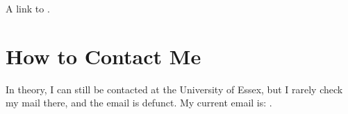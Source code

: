 \documentclass[a4paper]{article}
\begin{document}
A link to .


\section{How to Contact Me}

In theory, I can still be contacted at the University of Essex, but I rarely check my mail there,
and the email is defunct. My current email is: .

% 
% 
% 
% 
% 
% 
% 

%
\end{document}
